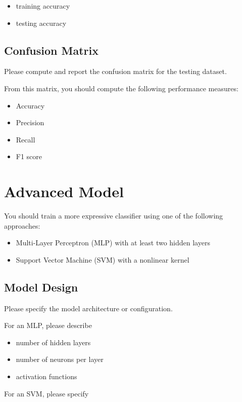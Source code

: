 \documentclass[12pt]{article}
\begin{document}
\begin{itemize}
\item training accuracy
\item testing accuracy
\end{itemize}

\subsection{Confusion Matrix}

Please compute and report the confusion matrix for the testing dataset.

From this matrix, you should compute the following performance measures:

\begin{itemize}
\item Accuracy
\item Precision
\item Recall
\item F1 score
\end{itemize}

\section{Advanced Model}

You should train a more expressive classifier using one of the following approaches:

\begin{itemize}
\item Multi-Layer Perceptron (MLP) with at least two hidden layers
\item Support Vector Machine (SVM) with a nonlinear kernel
\end{itemize}

\subsection{Model Design}

Please specify the model architecture or configuration.

For an MLP, please describe

\begin{itemize}
\item number of hidden layers
\item number of neurons per layer
\item activation functions
\end{itemize}

For an SVM, please specify
\end{document}
